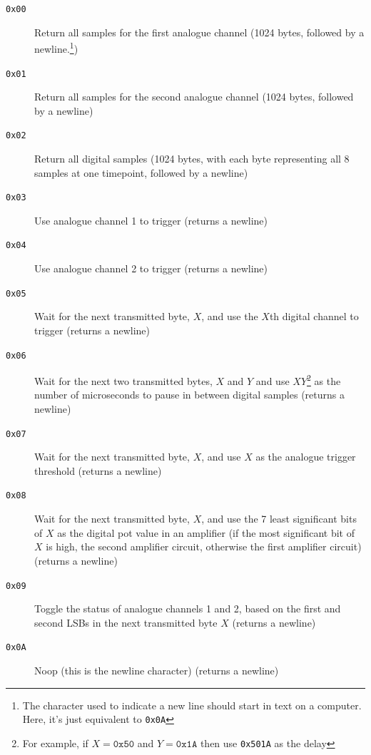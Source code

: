 \begin{description}

  \item[\texttt{0x00}] Return all samples for the first analogue channel (1024
  bytes, followed by a newline.\footnote{The character used to indicate a new
  line should start in text on a computer. Here, it's just equivalent to
  \texttt{0x0A}})

  \item[\texttt{0x01}] Return all samples for the second analogue channel (1024
  bytes, followed by a newline)

  \item[\texttt{0x02}] Return all digital samples (1024 bytes, with each byte
    representing all 8 samples at one timepoint, followed by a newline)

  \item[\texttt{0x03}] Use analogue channel 1 to trigger (returns a newline)

  \item[\texttt{0x04}] Use analogue channel 2 to trigger (returns a newline)

  \item[\texttt{0x05}] Wait for the next transmitted byte, $X$, and use the
  $X$th digital channel to trigger (returns a newline)

  \item[\texttt{0x06}] Wait for the next two transmitted bytes, $X$ and $Y$ and
  use $XY$\footnote{For example, if $X = \texttt{0x50}$ and $Y=\texttt{0x1A}$
  then use \texttt{0x501A} as the delay} as the number of microseconds to pause
  in between digital samples (returns a newline)

  \item[\texttt{0x07}] Wait for the next transmitted byte, $X$, and use $X$ as
  the analogue trigger threshold (returns a newline)

  \item[\texttt{0x08}] Wait for the next transmitted byte, $X$, and use the 7
  least significant bits of $X$ as the digital pot value in an amplifier (if the
  most significant bit of $X$ is high, the second amplifier circuit, otherwise
  the first amplifier circuit) (returns a newline)

  \item[\texttt{0x09}] Toggle the status of analogue channels 1 and 2, based on
    the first and second LSBs in the next transmitted byte $X$ (returns a
    newline)

  \item[\texttt{0x0A}] Noop (this is the newline character) (returns a newline)


\end{description}
